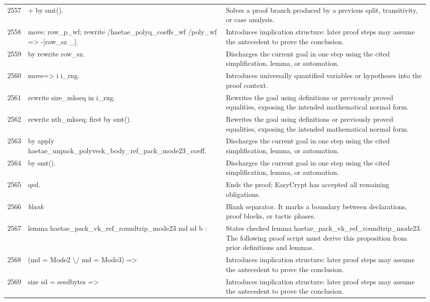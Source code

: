 \documentclass[10pt]{article}
\begin{document}
\begin{longtable}{r L{0.53\textwidth} L{0.37\textwidth}}
2557 & {\ttfamily\scriptsize     + by smt().} & Solves a proof branch produced by a previous split, transitivity, or case analysis. \\
2558 & {\ttfamily\scriptsize     move: row\_p\_wf; rewrite /haetae\_polyq\_coeffs\_wf /poly\_wf => -[row\_sz \_].} & Introduces implication structure: later proof steps may assume the antecedent to prove the conclusion. \\
2559 & {\ttfamily\scriptsize     by rewrite row\_sz.} & Discharges the current goal in one step using the cited simplification, lemma, or automation. \\
2560 & {\ttfamily\scriptsize   move=> i i\_rng.} & Introduces universally quantified variables or hypotheses into the proof context. \\
2561 & {\ttfamily\scriptsize   rewrite size\_mkseq in i\_rng.} & Rewrites the goal using definitions or previously proved equalities, exposing the intended mathematical normal form. \\
2562 & {\ttfamily\scriptsize   rewrite nth\_mkseq; first by smt().} & Rewrites the goal using definitions or previously proved equalities, exposing the intended mathematical normal form. \\
2563 & {\ttfamily\scriptsize   by apply haetae\_unpack\_polyveck\_body\_ref\_pack\_mode23\_coeff.} & Discharges the current goal in one step using the cited simplification, lemma, or automation. \\
2564 & {\ttfamily\scriptsize by smt().} & Discharges the current goal in one step using the cited simplification, lemma, or automation. \\
2565 & {\ttfamily\scriptsize qed.} & Ends the proof; EasyCrypt has accepted all remaining obligations. \\
2566 & {\ttfamily\scriptsize \emph{blank}} & Blank separator.  It marks a boundary between declarations, proof blocks, or tactic phases. \\
2567 & {\ttfamily\scriptsize lemma haetae\_pack\_vk\_ref\_roundtrip\_mode23 md sd b :} & States checked lemma haetae\_pack\_vk\_ref\_roundtrip\_mode23.  The following proof script must derive this proposition from prior definitions and lemmas. \\
2568 & {\ttfamily\scriptsize   (md = Mode2 \textbackslash{}/ md = Mode3) =>} & Introduces implication structure: later proof steps may assume the antecedent to prove the conclusion. \\
2569 & {\ttfamily\scriptsize   size sd = seedbytes =>} & Introduces implication structure: later proof steps may assume the antecedent to prove the conclusion. \\

\end{longtable}
\end{document}

